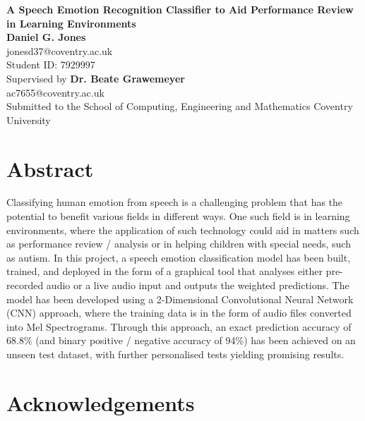 \documentclass[12pt]{article}
\begin{document}

\begin{center}
	\vspace*{1cm}
	\Huge \textbf{A Speech Emotion Recognition Classifier to Aid Performance Review in Learning Environments} \\[1em]
	\vspace{5cm}
	\LARGE \textbf{Daniel G. Jones}
	\\
	\vspace{0.3cm}
	\large jonesd37@coventry.ac.uk
	\\
	\large Student ID: 7929997
	\\
	\vspace{3cm}
	\large Supervised by \textbf{Dr. Beate Grawemeyer}
	\\
	\vspace{0.3cm}
	\large ac7655@coventry.ac.uk
	\\
	\vspace{3cm}
	\large Submitted to the School of Computing, Engineering and Mathematics Coventry University
\end{center}
\newpage
\tableofcontents
\newpage
\section{Abstract}

Classifying human emotion from speech is a challenging problem that has the potential to benefit various fields in different ways. One such field is in learning environments, where the application of such technology could aid in matters such as performance review / analysis or in helping children with special needs, such as autism. In this project, a speech emotion classification model has been built, trained, and deployed in the form of a graphical tool that analyses either pre-recorded audio or a live audio input and outputs the weighted predictions. The model has been developed using a 2-Dimensional Convolutional Neural Network (CNN) approach, where the training data is in the form of audio files converted into Mel Spectrograms. Through this approach, an exact prediction accuracy of 68.8\% (and binary positive / negative accuracy of 94\%) has been achieved on an unseen test dataset, with further personalised tests yielding promising results.

\section{Acknowledgements}
\end{document}
